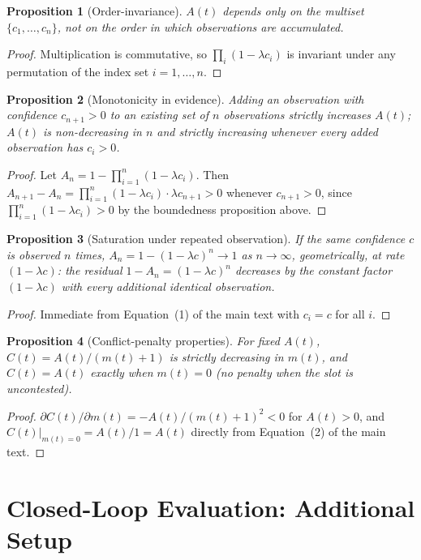\documentclass[11pt]{article}
\newtheorem{proposition}{Proposition}[section]
\begin{document}
\begin{proposition}[Order-invariance]
$A(t)$ depends only on the multiset $\{c_1,\dots,c_n\}$, not on the order
in which observations are accumulated.
\end{proposition}
\begin{proof}
Multiplication is commutative, so $\prod_i(1-\lambda c_i)$ is invariant
under any permutation of the index set $i=1,\dots,n$.
\end{proof}

\begin{proposition}[Monotonicity in evidence]
\label{prop:monotone}
Adding an observation with confidence $c_{n+1} > 0$ to an existing set of
$n$ observations strictly increases $A(t)$; $A(t)$ is non-decreasing in
$n$ and strictly increasing whenever every added observation has
$c_i > 0$.
\end{proposition}
\begin{proof}
Let $A_n = 1-\prod_{i=1}^n(1-\lambda c_i)$. Then
$A_{n+1} - A_n = \prod_{i=1}^n(1-\lambda c_i) \cdot \lambda c_{n+1} > 0$
whenever $c_{n+1} > 0$, since $\prod_{i=1}^n(1-\lambda c_i) > 0$ by the
boundedness proposition above.
\end{proof}

\begin{proposition}[Saturation under repeated observation]
\label{prop:saturation}
If the same confidence $c$ is observed $n$ times, $A_n = 1-(1-\lambda c)^n
\to 1$ as $n \to \infty$, geometrically, at rate $(1-\lambda c)$: the
residual $1 - A_n = (1-\lambda c)^n$ decreases by the constant factor
$(1-\lambda c)$ with every additional identical observation.
\end{proposition}
\begin{proof}
Immediate from Equation~(1) of the main text with $c_i=c$ for all $i$.
\end{proof}


\begin{proposition}[Conflict-penalty properties]
\label{prop:conflict}
For fixed $A(t)$, $C(t) = A(t)/(m(t)+1)$ is strictly decreasing in
$m(t)$, and $C(t) = A(t)$ exactly when $m(t)=0$ (no penalty when the slot
is uncontested).
\end{proposition}
\begin{proof}
$\partial C(t)/\partial m(t) = -A(t)/(m(t)+1)^2 < 0$ for $A(t) > 0$, and
$C(t)|_{m(t)=0} = A(t)/1 = A(t)$ directly from Equation~(2) of the main text.
\end{proof}


\section{Closed-Loop Evaluation: Additional Setup}
\label{sec:s15}
\end{document}
